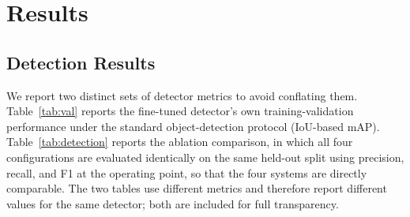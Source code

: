 \documentclass[conference]{IEEEtran}
\begin{document}
\begin{table}[!t]
\caption{Reported Training and Evaluation Configuration}
\label{tab:trainingconfig}
\centering
{}
\end{table}

\section{Results}
\label{sec:results}
\subsection{Detection Results}
We report two distinct sets of detector metrics to avoid
conflating them. Table~\ref{tab:val} reports the fine-tuned
detector's own training-validation performance under the standard
object-detection protocol (IoU-based mAP). Table~\ref{tab:detection}
reports the ablation comparison, in which all four configurations
are evaluated identically on the same held-out split using
precision, recall, and F1 at the operating point, so that the
four systems are directly comparable. The two tables use
different metrics and therefore report different values for the
same detector; both are included for full transparency.
\end{document}
